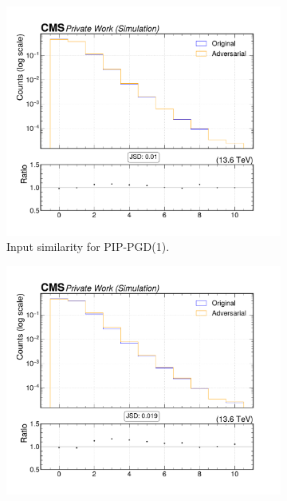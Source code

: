 \begin{figure}[htbp]
  \centering
  \begin{subfigure}[t]{0.32\textwidth}
    \includegraphics[width=\linewidth]{media/output/features/compare/combined_it_1/cmp_global_features_nsv.pdf}
    \caption*{Input similarity for PIP-PGD(1).}
  \end{subfigure}\hfill
  \begin{subfigure}[t]{0.32\textwidth}
    \includegraphics[width=\linewidth]{media/output/features/compare/combined_it_2/cmp_global_features_nsv.pdf}

\end{subfigure}
\end{figure}
